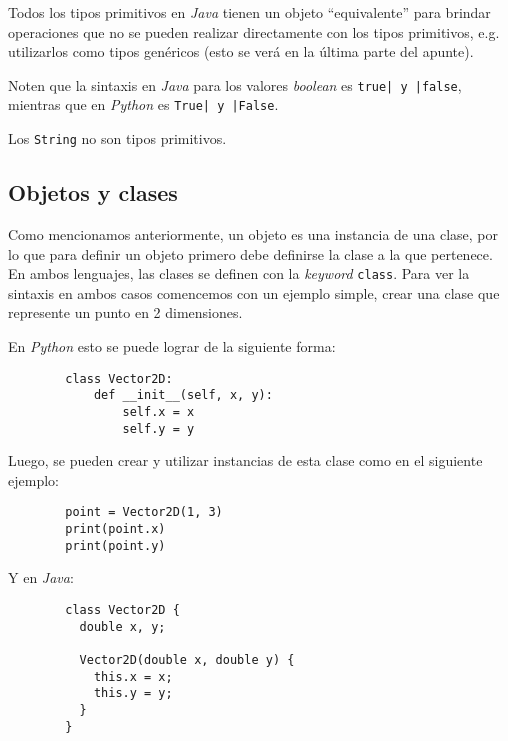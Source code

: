     Todos los tipos primitivos en \textit{Java} tienen un objeto \enquote{equivalente} 
    para brindar operaciones que no se pueden realizar directamente con los tipos 
    primitivos, e.g. utilizarlos como tipos genéricos (esto se verá en la última parte del 
    apunte).

    Noten que la sintaxis en \textit{Java} para los valores \textit{boolean} es 
    \texttt{true| y |false}, mientras que en \textit{Python} es 
    \texttt{True| y |False}.

    \begin{important}
      Los \texttt{String} no son tipos primitivos.
    \end{important}

  \subsection{Objetos y clases}
    Como mencionamos anteriormente, un objeto es una instancia de una clase, por lo que para
    definir un objeto primero debe definirse la clase a la que pertenece.
    En ambos lenguajes, las clases se definen con la \textit{keyword} 
    \texttt{class}.
    Para ver la sintaxis en ambos casos comencemos con un ejemplo simple, crear una clase 
    que represente un punto en 2 dimensiones.

    En \textit{Python} esto se puede lograr de la siguiente forma:

    \begin{listing}[ht!]
      \begin{verbatim}
        class Vector2D:
            def __init__(self, x, y):
                self.x = x
                self.y = y
      \end{verbatim}
    \end{listing}

    Luego, se pueden crear y utilizar instancias de esta clase como en el siguiente 
    ejemplo:

    \begin{listing}[ht!]
      \begin{verbatim}
        point = Vector2D(1, 3)
        print(point.x)
        print(point.y)
      \end{verbatim}
    \end{listing}

    Y en \textit{Java}:
    \begin{listing}[ht!]
      \begin{verbatim}
        class Vector2D {
          double x, y;

          Vector2D(double x, double y) {
            this.x = x;
            this.y = y;
          }
        }
      \end{verbatim}
    \end{listing}

